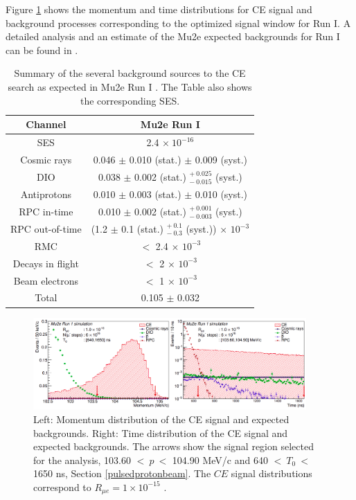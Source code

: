 Figure \ref{fig:sensitivity} shows the momentum and time distributions 
for CE signal and background processes corresponding to the optimized 
signal window for Run I. A detailed analysis and an estimate of the Mu2e 
expected backgrounds for Run I can be found in \cite{universe9010054}.
\begin{center}  
\begin{table}[!h]
\centering
\renewcommand{\arraystretch}{1.2}
\begin{tabular}{| c | c |}
\hline
\textbf{Channel} & \textbf{Mu2e Run I}\\
\hline
SES & 2.4 $\times \ 10^{-16}$ \\
\hline
Cosmic rays & 0.046 $\pm$ 0.010 (stat.) $\pm$ 0.009 (syst.) \\
DIO & 0.038 $\pm$ 0.002 (stat.) $ ^{+ \ 0.025} _{- \ 0.015}$ (syst.)\\
Antiprotons & 0.010 $\pm$ 0.003 (stat.) $\pm$ 0.010 (syst.) \\
RPC in-time & 0.010 $\pm$ 0.002 (stat.) $ ^{+ \ 0.001} _{- \ 0.003}$ (syst.)\\
RPC out-of-time & (1.2 $\pm$ 0.1  (stat.) $ ^{+ \ 0.1} _{- \ 0.3}$ (syst.)) $\times$ $10^{-3}$ \\
RMC & $<$ 2.4 $\times$ $10^{-3}$ \\
Decays in flight & $<$ 2 $\times$ $10^{-3}$ \\
Beam electrons & $<$ 1 $\times$ $10^{-3}$ \\
\hline
Total &  0.105 $\pm$ 0.032\\
\hline
\end{tabular}
\caption{Summary of the several background sources to 
the CE search as expected in Mu2e Run I \cite{universe9010054}. 
The Table also shows the corresponding SES. }

\label{tab:summarybkg}
\end{table}
\end{center}
\begin{figure}[!h]
\centering
\includegraphics[width =0.93\textwidth]{figures/png/Screenshot_20240225_102708.png}
\caption[Mu2e simulated signal.]{Left: Momentum distribution of the CE signal and expected backgrounds. Right: Time distribution of the CE signal and expected backgrounds. The arrows show the signal region selected for the analysis, 103.60 $< \ p \ < $ 104.90 MeV/c and 640 $< \ T_0 \ < $ 1650 ns, Section \ref{pulsedprotonbeam}. The $CE$ signal distributions correspond to $R_{\mu e} = 1 \times 10^{-15}$ \cite{universe9010054}.}
\label{fig:sensitivity}
\end{figure}
